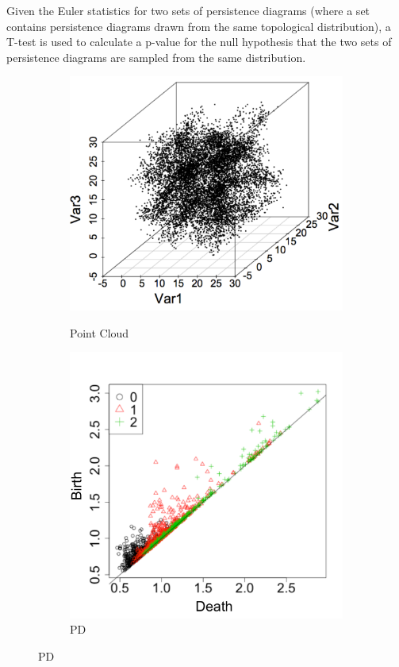 \documentclass[12pt]{article}
\begin{document}
Given the Euler statistics for two sets of persistence diagrams (where a set contains persistence diagrams drawn from the same topological distribution), a T-test is used to calculate a p-value for the null hypothesis that the two sets of persistence diagrams are sampled from the same distribution. 

\begin{figure}[htbp]
   \centering 
  \begin{subfigure}{.24\textwidth}
    \centering
        \caption{Point Cloud}       \includegraphics[width=\linewidth]{test_pics_1.pdf}
    \label{fig:examplestest1}
  \end{subfigure}
    \begin{subfigure}{.24\textwidth}
    \centering
        \caption{PD}  \includegraphics[width=\linewidth]{test_pics_2.pdf}

\end{subfigure}
\end{figure}
\end{document}
